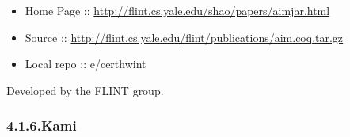 \documentclass[12pt,twoside]{article}
\begin{document}
\begin{itemize}[noitemsep,topsep=\mdcompacttopsep]%

\item{}Home Page :: \href{http://flint.cs.yale.edu/shao/papers/aimjar.html}{{\ttfamily http://\hspace{0pt}flint.\hspace{0pt}cs.\hspace{0pt}yale.\hspace{0pt}edu/\hspace{0pt}shao/\hspace{0pt}papers/\hspace{0pt}aimjar.\hspace{0pt}html}}%

\item{}Source :: \href{http://flint.cs.yale.edu/flint/publications/aim.coq.tar.gz}{{\ttfamily http://\hspace{0pt}flint.\hspace{0pt}cs.\hspace{0pt}yale.\hspace{0pt}edu/\hspace{0pt}flint/\hspace{0pt}publications/\hspace{0pt}aim.\hspace{0pt}coq.\hspace{0pt}tar.\hspace{0pt}gz}}%

\item{}Local repo :: e/certhwint%
\end{itemize}%

\noindent{}Developed by the FLINT group.%

\subsubsection{4.1.6.\hspace*{0.5em}Kami}\label{sec-kami}%
\end{document}

